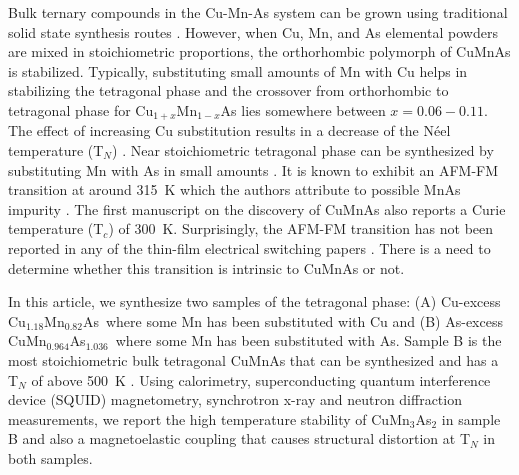 \documentclass[letterpaper,10pt,doublespacing,edeposit]{uiucthesis2020}
\newcommand*{\cumnas}{Cu$_{0.82}$Mn$_{1.18}$As}
\newcommand*{\cuexcess}{Cu$_{1.18}$Mn$_{0.82}$As}
\newcommand*{\asexcess}{CuMn$_{0.964}$As$_{1.036}$}
\begin{document}
\begin{mainmatter}
Bulk ternary compounds in the Cu-Mn-As system can be grown using traditional solid state synthesis routes \cite{Uhlirova2015,Uhlirova2019,Karigerasi2019}. However, when Cu, Mn, and As elemental powders are mixed in stoichiometric proportions, the orthorhombic polymorph of CuMnAs is stabilized. Typically, substituting small amounts of Mn with Cu helps in stabilizing the tetragonal phase and the crossover from orthorhombic to tetragonal phase for Cu$_{1+x}$Mn$_{1-x}$As lies somewhere between $x = 0.06 - 0.11$. The effect of increasing Cu substitution results in a decrease of the N\'eel temperature (T$_N$) \cite{Uhlirova2019}. Near stoichiometric tetragonal phase can be synthesized by substituting Mn with As in small amounts \cite{Uhlirova2019,Volny2020}. It is known to exhibit an AFM-FM transition at around 315~K which the authors attribute to possible MnAs impurity \cite{Uhlirova2019}. The first manuscript on the discovery of CuMnAs also reports a Curie temperature (T$_c$) of 300~K. Surprisingly, the AFM-FM transition has not been reported in any of the thin-film electrical switching papers \cite{Wadley2016,Meinert2018,Matalla-Wagner2019}. There is a need to determine whether this transition is intrinsic to CuMnAs or not.


In this article, we synthesize two samples of the tetragonal phase: (A) Cu-excess \cuexcess\ where some Mn has been substituted with Cu and (B) As-excess \asexcess\ where some Mn has been substituted with As. Sample B is the most stoichiometric bulk tetragonal CuMnAs that can be synthesized and has a T$_N$ of above 500~K \cite{Uhlirova2019}. Using calorimetry, superconducting quantum interference device (SQUID) magnetometry, synchrotron x-ray and neutron diffraction measurements, we report the high temperature stability of CuMn$_3$As$_2$ in sample B and also a magnetoelastic coupling that causes structural distortion at T$_N$ in both samples.


\end{mainmatter}
\end{document}
